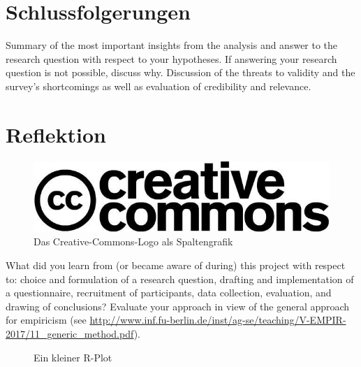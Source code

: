 \documentclass[de]{agse-empir-report}\usepackage[]{graphicx}\usepackage[]{color}
\makeatletter
\newenvironment{kframe}{%
 \def\at@end@of@kframe{}%
 \ifinner\ifhmode%
  \def\at@end@of@kframe{\end{minipage}}%
  \begin{minipage}{\columnwidth}%
 \fi\fi%
 \def\FrameCommand##1{\hskip\@totalleftmargin \hskip-\fboxsep
 \colorbox{shadecolor}{##1}\hskip-\fboxsep
     \hskip-\linewidth \hskip-\@totalleftmargin \hskip\columnwidth}%
 \MakeFramed {\advance\hsize-\width
   \@totalleftmargin\z@ \linewidth\hsize
   \@setminipage}}%
 {\par\unskip\endMakeFramed%
 \at@end@of@kframe}
\newenvironment{knitrout}{}{} %
\makeatother
\begin{document}
\section[hs]{Schlussfolgerungen} \label{schlusfolgerung}
Summary of the most important insights from the analysis and
answer to the research question with respect to your hypotheses.
If answering your research question is not possible, discuss why.
Discussion of the threats to validity and the survey's
shortcomings as well as evaluation of credibility and relevance.

\lipsum[9-10]


\section[kk]{Reflektion} \label{reflektion}

\begin{figure}
    \includegraphics[width=\linewidth]{creative_commons.jpg}
    \caption{Das Creative-Commons-Logo als Spaltengrafik}
\end{figure}

What did you learn from (or became aware of during) this project with
respect to: choice and formulation of a research question,
drafting and implementation of a questionnaire,
recruitment of participants,
data collection, evaluation, and drawing of conclusions?
Evaluate your approach in view of the general approach for
empiricism (see
\url{http://www.inf.fu-berlin.de/inst/ag-se/teaching/V-EMPIR-2017/11_generic_method.pdf}).

\lipsum[11-13]

\begin{figure}
\begin{knitrout}
\color{fgcolor}\begin{kframe}


{\ttfamily\noindent\bfseries{}}

{\ttfamily\noindent\bfseries{}}

{\ttfamily\noindent\bfseries\color{errorcolor}{\#\# Error in print(plt): Objekt 'plt' nicht gefunden}}\end{kframe}
\end{knitrout}
    \caption{Ein kleiner R-Plot}
\end{figure}
\end{document}
